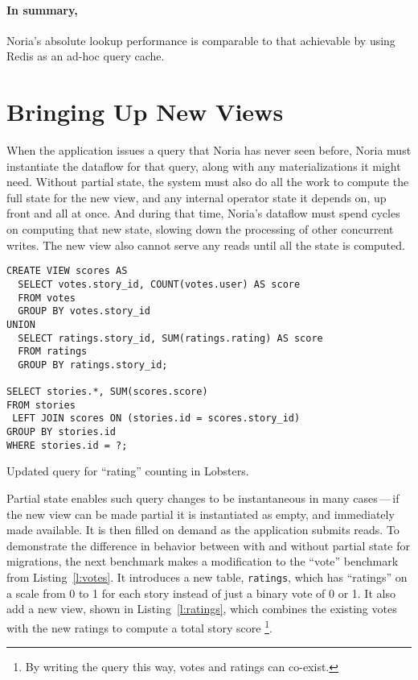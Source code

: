 \paragraph{In summary,} Noria's absolute lookup performance is comparable to
that achievable by using Redis as an ad-hoc query cache.

\section{Bringing Up New Views}
\label{s:eval:mig}

When the application issues a query that Noria has never seen before, Noria must
instantiate the dataflow for that query, along with any materializations it
might need. Without partial state, the system must also do all the work to
compute the full state for the new view, and any internal operator state it
depends on, up front and all at once. And during that time, Noria's dataflow
must spend cycles on computing that new state, slowing down the processing of
other concurrent writes. The new view also cannot serve any reads until all the
state is computed.

\begin{listing}[h]
  \begin{verbatim}
CREATE VIEW scores AS
  SELECT votes.story_id, COUNT(votes.user) AS score
  FROM votes
  GROUP BY votes.story_id
UNION
  SELECT ratings.story_id, SUM(ratings.rating) AS score
  FROM ratings
  GROUP BY ratings.story_id;

SELECT stories.*, SUM(scores.score)
FROM stories
 LEFT JOIN scores ON (stories.id = scores.story_id)
GROUP BY stories.id
WHERE stories.id = ?;
  \end{verbatim}
  \caption{Updated query for ``rating'' counting in Lobsters.}
  \label{l:ratings}
\end{listing}

Partial state enables such query changes to be instantaneous in many
cases\,---\,if the new view can be made partial it is instantiated as empty, and
immediately made available. It is then filled on demand as the application
submits reads. To demonstrate the difference in behavior between with and
without partial state for migrations, the next benchmark makes a modification to
the ``vote'' benchmark from Listing~\ref{l:votes}. It introduces a new table,
\texttt{ratings}, which has ``ratings'' on a scale from 0 to 1 for each story
instead of just a binary vote of 0 or 1. It also add a new view, shown in
Listing~\vref{l:ratings}, which combines the existing votes with the new ratings
to compute a total story score%
\footnote{By writing the query this way, votes and ratings can co-exist.}.

